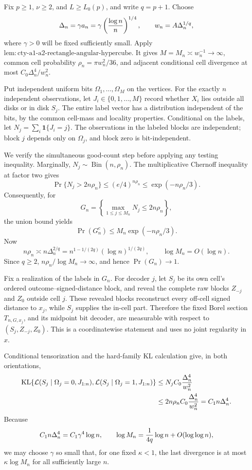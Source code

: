 Fix \(p\geq1\), \(\nu\geq2\), and \(L\geq L_0(p)\), and write \(q=p+1\).  Choose
\[
 \Delta_n=\gamma a_n=\gamma\left({\log n\over n}\right)^{1/4},
 \qquad w_n=A\Delta_n^{1/q},
\]
where \(\gamma>0\) will be fixed sufficiently small.  Apply \(\mathrm{lem:cty\text{-}a1\text{-}a2\text{-}rectangle\text{-}angular\text{-}hypercube}\).  It gives \(M=M_n\asymp w_n^{-1}\to\infty\), common cell probability \(\rho_n=\pi w_n^2/36\), and adjacent conditional cell divergence at most \(C_0\Delta_n^4/w_n^2\).

Put independent uniform bits \(\Omega_1,\ldots,\Omega_M\) on the vertices.  For the exactly \(n\) independent observations, let \(J_i\in\{0,1,\ldots,M\}\) record whether \(X_i\) lies outside all disks or in disk \(S_j\).  The entire label vector has a distribution independent of the bits, by the common cell-mass and locality properties.  Conditional on the labels, let \(N_j=\sum_i\mathbf 1\{J_i=j\}\).  The observations in the labeled blocks are independent; block \(j\) depends only on \(\Omega_j\), and block zero is bit-independent.

We verify the simultaneous good-count step before applying any testing inequality.  Marginally, \(N_j\sim\operatorname{Bin}(n,\rho_n)\).  The multiplicative Chernoff inequality at factor two gives
\[
 \Pr\{N_j>2n\rho_n\}\leq(e/4)^{n\rho_n}\leq\exp(-n\rho_n/3).
\]
Consequently, for
\[
 G_n=\left\{\max_{1\leq j\leq M_n}N_j\leq2n\rho_n\right\},
\]
the union bound yields
\[
 \Pr(G_n^c)\leq M_n\exp(-n\rho_n/3).
\]
Now
\[
 n\rho_n\asymp n\Delta_n^{2/q}
 =n^{1-1/(2q)}(\log n)^{1/(2q)},
 \qquad \log M_n=O(\log n).
\]
Since \(q\geq2\), \(n\rho_n/\log M_n\to\infty\), and hence \(\Pr(G_n)\to1\).

Fix a realization of the labels in \(G_n\).  For decoder \(j\), let \(S_j\) be its own cell's ordered outcome--signed-distance block, and reveal the complete raw blocks \(Z_{-j}\) and \(Z_0\) outside cell \(j\).  These revealed blocks reconstruct every off-cell signed distance to \(x_j\), while \(S_j\) supplies the in-cell part.  Therefore the fixed Borel section \(T_{n,G,x_j}\), and its midpoint bit decoder, are measurable with respect to \((S_j,Z_{-j},Z_0)\).  This is a coordinatewise statement and uses no joint regularity in \(x\).

Conditional tensorization and the hard-family KL calculation give, in both orientations,
\[
\begin{aligned}
 \operatorname{KL}\{\mathcal L(S_j\mid\Omega_j=0,J_{1:n}),
                      \mathcal L(S_j\mid\Omega_j=1,J_{1:n})\}
 &\leq N_jC_0{\Delta_n^4\over w_n^2}\\
 &\leq2n\rho_nC_0{\Delta_n^4\over w_n^2}
 =C_1n\Delta_n^4.
\end{aligned}
\]
Because
\[
 C_1n\Delta_n^4=C_1\gamma^4\log n,
 \qquad
 \log M_n={1\over4q}\log n+O(\log\log n),
\]
we may choose \(\gamma\) so small that, for one fixed \(\kappa<1\), the last divergence is at most \(\kappa\log M_n\) for all sufficiently large \(n\).

